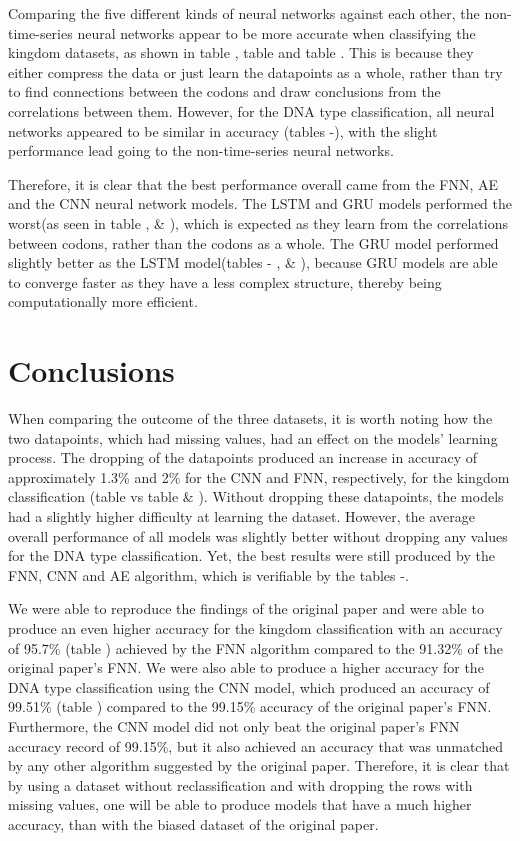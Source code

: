 \documentclass[conference]{IEEEtran}
\newcommand{\rom}[1]{\uppercase\expandafter{\romannumeral #1\relax}}
\begin{document}
\newpage

Comparing the five different kinds of neural networks against each other, the non-time-series neural networks appear to be more accurate when classifying the kingdom datasets, as shown in table \rom{1}, table \rom{2} and table \rom{3}. This is because they either compress the data or just learn the datapoints as a whole, rather than try to find connections between the codons and draw conclusions from the correlations between them\cite{Elsworth}. However, for the DNA type classification, all neural networks appeared to be similar in accuracy (tables \rom{4}-\rom{6}), with the slight performance lead going to the non-time-series neural networks. 

Therefore, it is clear that the best performance overall came from the FNN, AE and the CNN neural network models. The LSTM and GRU models performed the worst(as seen in table \rom{1},\rom{2} \& \rom{3}), which is expected as they learn from the correlations between codons, rather than the codons as a whole. The GRU model performed slightly better as the LSTM model(tables \rom{1} - \rom{3}, \rom{5} \& \rom{6}), because GRU models are able to converge faster as they have a less complex structure, thereby being computationally more efficient\cite{Chung}. 


\section{Conclusions}
When comparing the outcome of the three datasets, it is worth noting how the two datapoints, which had missing values, had an effect on the models’ learning process. The dropping of the datapoints produced an increase in accuracy of approximately 1.3\% and 2\% for the CNN and FNN, respectively, for the kingdom classification (table \rom{1} vs table \rom{2} \& \rom{3}). Without dropping these datapoints, the models had a slightly higher difficulty at learning the dataset. However, the average overall performance of all models was slightly better without dropping any values for the DNA type classification. Yet, the best results were still produced by the FNN, CNN and AE algorithm, which is verifiable by the tables \rom{1}-\rom{6}. 

We were able to reproduce the findings of the original paper and were able to produce an even higher accuracy for the kingdom classification with an accuracy of 95.7\% (table \rom{1}) achieved by the FNN algorithm compared to the 91.32\% of the original paper’s FNN. We were also able to produce a higher accuracy for the DNA type classification using the CNN model, which produced an accuracy of 99.51\% (table \rom{4}) compared to the 99.15\% accuracy of the original paper’s FNN. Furthermore, the CNN model did not only beat the original paper’s FNN accuracy record of 99.15\%, but it also achieved an accuracy that was unmatched by any other algorithm suggested by the original paper. Therefore, it is clear that by using a dataset without reclassification and with dropping the rows with missing values, one will be able to produce models that have a much higher accuracy, than with the biased dataset of the original paper. 
\end{document}
